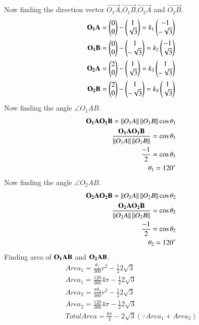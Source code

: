 \documentclass[journal,12pt,twocolumn]{IEEEtran}
\begin{document}
 Now finding the direction vector $\vec{O_1A}$,$\vec{O_1B}$,$\vec{O_2A}$ and $\vec{O_2B}$.
 \begin{align}
\mathbf{O_1A}=\begin{pmatrix}0\\0\end{pmatrix}-\begin{pmatrix}1\\\sqrt{3}\end{pmatrix}=k_1\begin{pmatrix}-1\\-\sqrt{3}\end{pmatrix}\\
\mathbf{O_1B}=\begin{pmatrix}0\\0\end{pmatrix}-\begin{pmatrix}1\\-\sqrt{3}\end{pmatrix}=k_2\begin{pmatrix}-1\\\sqrt{3}\end{pmatrix}\\
\mathbf{O_2A}=\begin{pmatrix}2\\0\end{pmatrix}-\begin{pmatrix}1\\\sqrt{3}\end{pmatrix}=k_3\begin{pmatrix}1\\-\sqrt{3}\end{pmatrix}\\
\mathbf{O_2B}=\begin{pmatrix}2\\0\end{pmatrix}-\begin{pmatrix}1\\-\sqrt{3}\end{pmatrix}=k_4\begin{pmatrix}1\\\sqrt{3}\end{pmatrix}
\end{align}
Now finding the angle $\angle{O_1AB}$.
\begin{align}
    \mathbf{O_1A}\mathbf{O_1B}=\left\lVert O_1A\right\rVert\left\lVert O_1B\right\rVert\cos\theta_1\\
    \frac{\mathbf{O_1A}\mathbf{O_1B}}{\left\lVert O_1A\right\rVert\left\lVert O_1B\right\rVert}=\cos\theta_1\\
    \frac{-1}{2}=\cos\theta_1\\
    \theta_1=120^{\circ}
\end{align}
Now finding the angle $\angle{O_2AB}$.
\begin{align}
    \mathbf{O_2A}\mathbf{O_2B}=\left\lVert O_2A\right\rVert\left\lVert O_2B\right\rVert\cos\theta_2\\
    \frac{\mathbf{O_2A}\mathbf{O_2B}}{\left\lVert O_2A\right\rVert\left\lVert O_2B\right\rVert}=\cos\theta_2\\
    \frac{-1}{2}=\cos\theta_2\\
    \theta_2=120^{\circ}
\end{align}
Finding area of $\bf{O_1AB}$ and $\bf{O_2AB}$.
 \begin{align}
Area_1=\frac{\theta_1}{360}r^2-\frac{1}{2}2\sqrt{3}\\
Area_1=\frac{120}{360}4\pi-\frac{1}{2}2\sqrt{3}\\
Area_2=\frac{\pi\theta_2}{360}r^2-\frac{1}{2}2\sqrt{3}\\
Area_2=\frac{120}{360}4\pi-\frac{1}{2}2\sqrt{3}\\
Total Area=\frac{8\pi}{3}-2\sqrt{3}{(\because Area_1+Area_2)}
\end{align}
\end{document}
